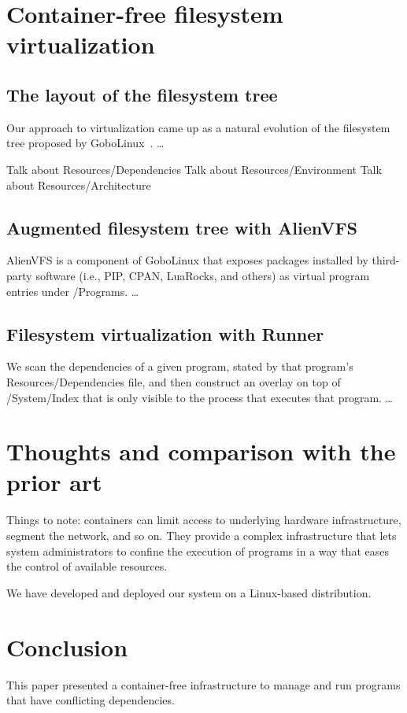 \section{Container-free filesystem virtualization}

\subsection{The layout of the filesystem tree}
Our approach to virtualization came up as a natural evolution of the filesystem tree proposed
by GoboLinux~\cite{GoboLinux}. \ldots

Talk about Resources/Dependencies
Talk about Resources/Environment
Talk about Resources/Architecture

\subsection{Augmented filesystem tree with AlienVFS}
AlienVFS is a component of GoboLinux that exposes packages installed by third-party software
(i.e., PIP, CPAN, LuaRocks, and others) as virtual program entries under /Programs. \ldots

\subsection{Filesystem virtualization with Runner}
We scan the dependencies of a given program, stated by that program's Resources/Dependencies
file, and then construct an overlay on top of /System/Index that is only visible to the process
that executes that program. \ldots


\section{Thoughts and comparison with the prior art}
Things to note: containers can limit access to underlying hardware infrastructure, segment the
network, and so on. They provide a complex infrastructure that lets system administrators to
confine the execution of programs in a way that eases the control of available resources.

We have developed and deployed our system on a Linux-based distribution.

\section{Conclusion}
This paper presented a container-free infrastructure to manage and run programs that have
conflicting dependencies. 
